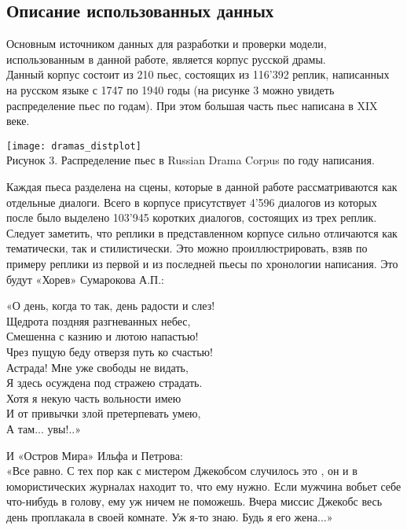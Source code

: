 \documentclass[a4paper,14pt]{article}
\begin{document}
\begin{center}
	\section*{Описание использованных данных}
\end{center}
\begin{justify}
Основным источником данных для разработки и проверки модели, использованным в данной работе, является корпус русской драмы. \\
\indent 
Данный корпус состоит из 210 пьес, состоящих из 116'392 реплик, написанных на русском языке с 1747 по 1940 годы (на рисунке 3 можно увидеть распределение пьес по годам). При этом большая часть пьес написана в XIX веке. \cite{dracor}
\begin{center}
	\texttt{[image: dramas\_distplot]}\\
	Рисунок 3. Распределение пьес в Russian Drama Corpus по году написания.
\end{center}
Каждая пьеса разделена на сцены, которые в данной работе рассматриваются как отдельные диалоги. Всего в корпусе присутствует 4'596 диалогов из которых после было выделено 103'945 коротких диалогов, состоящих из трех реплик. \\
\indent
Следует заметить, что реплики в представленном корпусе сильно отличаются как тематически, так и стилистически. Это можно проиллюстрировать, взяв по примеру реплики из первой и из последней пьесы по хронологии написания. Это будут «Хорев» Сумарокова А.П.:
\begin{center}
	«О день, когда то так, день радости и слез! \\
	Щедрота поздняя разгневанных небес, \\
	Смешенна с казнию и лютою напастью! \\
	Чрез пущую беду отверзя путь ко счастью! \\
	Астрада! Мне уже свободы не видать, \\
	Я здесь осуждена под стражею страдать. \\
	Хотя я некую часть вольности имею \\
	И от привычки злой претерпевать умею, \\
	А там... увы!..»
\end{center}
И «Остров Мира» Ильфа и Петрова: \\
\indent
«Все равно. С тех пор как с мистером Джекобсом случилось это , он и в юмористических журналах находит то, что ему нужно. Если мужчина вобьет себе что-нибудь в голову, ему уж ничем не поможешь. Вчера миссис Джекобс весь день проплакала в своей комнате. Уж я-то знаю. Будь я его жена...» \\

\end{justify}
\end{document}

